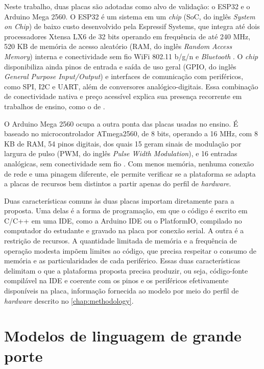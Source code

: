 Neste trabalho, duas placas são adotadas como alvo de validação: o ESP32 e o Arduino Mega 2560. O ESP32 é um sistema em um \textit{chip} (SoC, do inglês \textit{System on Chip}) de baixo custo desenvolvido pela Espressif Systems, que integra até dois processadores Xtensa LX6 de 32 bits operando em frequência de até 240 MHz, 520 KB de memória de acesso aleatório (RAM, do inglês \textit{Random Access Memory}) interna e conectividade sem fio WiFi 802.11 b/g/n e \textit{Bluetooth} \cite{espressif2026}. O \textit{chip} disponibiliza ainda pinos de entrada e saída de uso geral (GPIO, do inglês \textit{General Purpose Input/Output}) e interfaces de comunicação com periféricos, como SPI, I2C e UART, além de conversores analógico-digitais. Essa combinação de conectividade nativa e preço acessível explica sua presença recorrente em trabalhos de ensino, como o de .

O Arduino Mega 2560 ocupa a outra ponta das placas usadas no ensino. É baseado no microcontrolador ATmega2560, de 8 bits, operando a 16 MHz, com 8 KB de RAM, 54 pinos digitais, dos quais 15 geram sinais de modulação por largura de pulso (PWM, do inglês \textit{Pulse Width Modulation}), e 16 entradas analógicas, sem conectividade sem fio \cite{arduino2026}. Com menos memória, nenhuma conexão de rede e uma pinagem diferente, ele permite verificar se a plataforma se adapta a placas de recursos bem distintos a partir apenas do perfil de \textit{hardware}.

Duas características comuns às duas placas importam diretamente para a proposta. Uma delas é a forma de programação, em que o código é escrito em C/C++ em uma IDE, como a Arduino IDE ou o PlatformIO, compilado no computador do estudante e gravado na placa por conexão serial. A outra é a restrição de recursos. A quantidade limitada de memória e a frequência de operação modesta impõem limites ao código, que precisa respeitar o consumo de memória e as particularidades de cada periférico. Essas duas características delimitam o que a plataforma proposta precisa produzir, ou seja, código-fonte compilável na IDE e coerente com os pinos e os periféricos efetivamente disponíveis na placa, informação fornecida ao modelo por meio do perfil de \textit{hardware} descrito no \autoref{chap:methodology}.

\section{Modelos de linguagem de grande porte}
\label{sec:llm}


